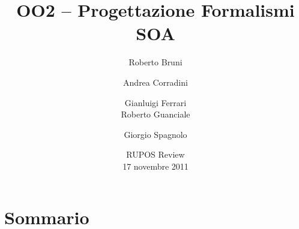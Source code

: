 \documentclass[10pt]{beamer}
\title{OO2 -- Progettazione Formalismi SOA}
\author[Bruni, \alert{Corradini}, Ferrari, Guanciale, Spagnolo]{Roberto Bruni \and \alert{Andrea Corradini}  \and Gianluigi Ferrari\\ 
Roberto Guanciale  \and Giorgio Spagnolo}
\institute{Dipartimento di Informatica, Pisa}
\date{RUPOS Review \\ 17 novembre 2011}
\begin{document}
\frame{\titlepage}

\section{Sommario}





\end{document}
